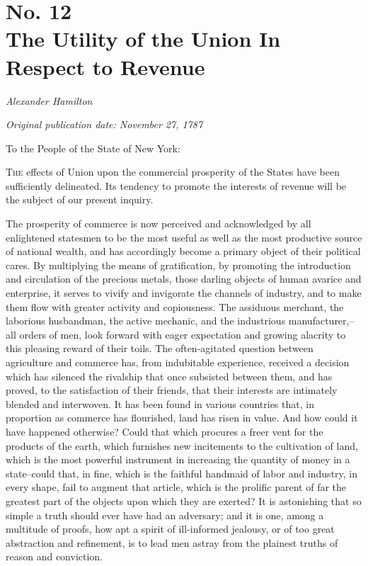 \chapter[No. 12: The Utility of the Union In Respect to Revenue]{No. 12\\ {\small The Utility of the Union In Respect to Revenue}}

\textit{Alexander Hamilton}

\textit{Original publication date: November 27, 1787}
\vspace{1cm}

To the People of the State of New York:
\vspace{.4cm}

\textsc{The} effects of Union upon the commercial prosperity of the States have been sufficiently delineated. 
Its tendency to promote the interests of revenue will be the subject of our present inquiry.

The prosperity of commerce is now perceived and acknowledged by all enlightened statesmen to be the most useful as well as the most productive source of national wealth, and has accordingly become a primary object of their political cares. 
By multiplying the means of gratification, by promoting the introduction and circulation of the precious metals, those darling objects of human avarice and enterprise, it serves to vivify and invigorate the channels of industry, and to make them flow with greater activity and copiousness. 
The assiduous merchant, the laborious husbandman, the active mechanic, and the industrious manufacturer,--all orders of men, look forward with eager expectation and growing alacrity to this pleasing reward of their toils. 
The often-agitated question between agriculture and commerce has, from indubitable experience, received a decision which has silenced the rivalship that once subsisted between them, and has proved, to the satisfaction of their friends, that their interests are intimately blended and interwoven. 
It has been found in various countries that, in proportion as commerce has flourished, land has risen in value. 
And how could it have happened otherwise? 
Could that which procures a freer vent for the products of the earth, which furnishes new incitements to the cultivation of land, which is the most powerful instrument in increasing the quantity of money in a state--could that, in fine, which is the faithful handmaid of labor and industry, in every shape, fail to augment that article, which is the prolific parent of far the greatest part of the objects upon which they are exerted? 
It is astonishing that so simple a truth should ever have had an adversary; and it is one, among a multitude of proofs, how apt a spirit of ill-informed jealousy, or of too great abstraction and refinement, is to lead men astray from the plainest truths of reason and conviction.

